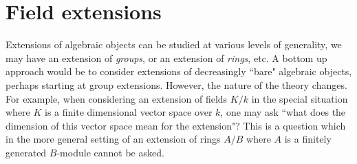 \documentclass[12pt]{article}
\theoremstyle{plain}
\theoremstyle{definition}
\begin{document}
\section{Field extensions}
Extensions of algebraic objects can be studied at various levels of generality, we may have an extension of \emph{groups}, or an extension of \emph{rings}, etc. A bottom up approach would be to consider extensions of decreasingly ``bare" algebraic objects, perhaps starting at group extensions. However, the nature of the theory changes. For example, when considering an extension of fields $K/k$ in the special situation where $K$ is a finite dimensional vector space over $k$, one may ask ``what does the dimension of this vector space mean for the extension"? This is a question which in the more general setting of an extension of rings $A/B$ where $A$ is a finitely generated $B$-module cannot be asked.
\end{document}
